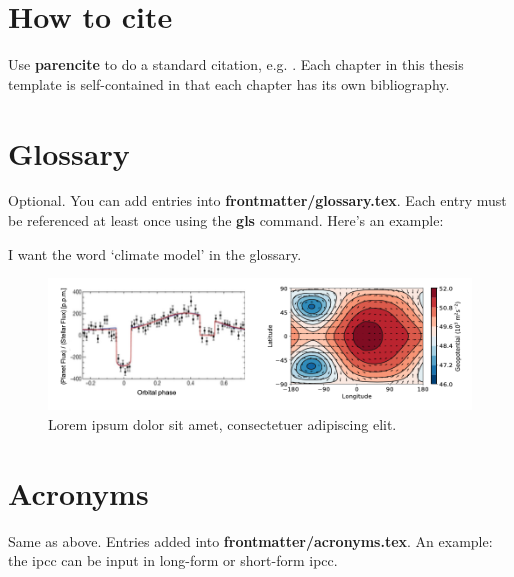 \section{How to cite}
Use \textbf{parencite} to do a standard citation, e.g. \parencite{Elliott2016}. Each chapter in this thesis template is self-contained in that each chapter has its own bibliography. 

\section{Glossary}
Optional. You can add entries into \textbf{frontmatter/glossary.tex}. Each entry must be referenced at least once using the \textbf{gls} command. Here's an example:

I want the word `\gls{climate model}' in the glossary.

\begin{figure}
    \centering
    \includegraphics{figures/random-figure.png}
    \caption{Lorem ipsum dolor sit amet, consectetuer adipiscing elit.}
    \label{fig:my_label}
\end{figure}

\section{Acronyms}
Same as above. Entries added into \textbf{frontmatter/acronyms.tex}. An example: the \acrlong{ipcc} can be input in long-form or short-form \acrshort{ipcc}.